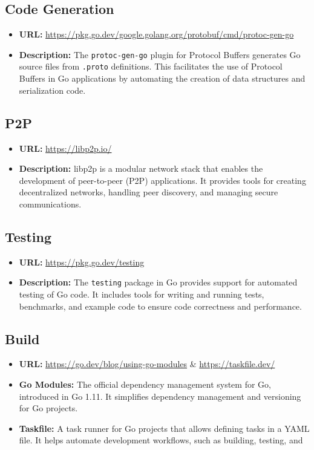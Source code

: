 \subsection*{Code Generation}
\begin{itemize}
    \item \textbf{URL:} \url{https://pkg.go.dev/google.golang.org/protobuf/cmd/protoc-gen-go}
    \item \textbf{Description:} The \texttt{protoc-gen-go} plugin for Protocol Buffers generates Go source files from \texttt{.proto} definitions. This facilitates the use of Protocol Buffers in Go applications by automating the creation of data structures and serialization code.
\end{itemize}

\subsection*{P2P}
\begin{itemize}
    \item \textbf{URL:} \url{https://libp2p.io/}
    \item \textbf{Description:} libp2p is a modular network stack that enables the development of peer-to-peer (P2P) applications. It provides tools for creating decentralized networks, handling peer discovery, and managing secure communications.
\end{itemize}

\subsection*{Testing}
\begin{itemize}
    \item \textbf{URL:} \url{https://pkg.go.dev/testing}
    \item \textbf{Description:} The \texttt{testing} package in Go provides support for automated testing of Go code. It includes tools for writing and running tests, benchmarks, and example code to ensure code correctness and performance.
\end{itemize}

\subsection*{Build}
\begin{itemize}
    \item \textbf{URL:} \url{https://go.dev/blog/using-go-modules} \& \url{https://taskfile.dev/}
    \item \textbf{Go Modules:} The official dependency management system for Go, introduced in Go 1.11. It simplifies dependency management and versioning for Go projects.
    \item \textbf{Taskfile:} A task runner for Go projects that allows defining tasks in a YAML file. It helps automate development workflows, such as building, testing, and
\end{itemize}


